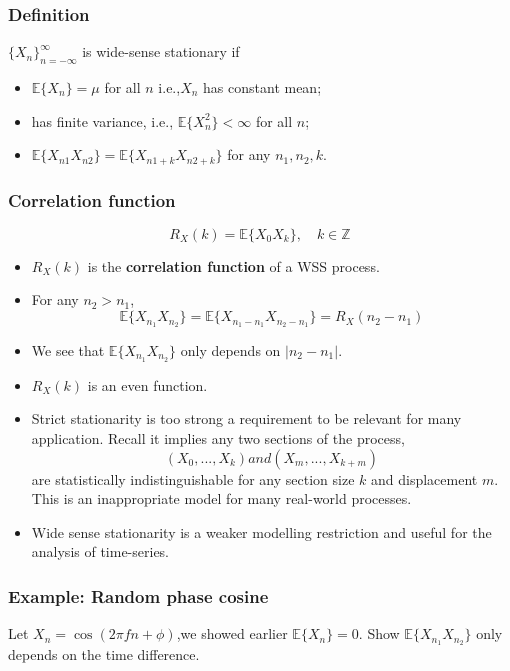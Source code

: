 \documentclass[12pt]{article}
\newcommand{\mexpproc}[1]{\mathbb{E}\{ #1\}}
\newcommand{\arproc}[1]{$\{#1_n \}_{n=-\infty}^{\infty}$}
\begin{document}
\subsubsection{Definition}
    \arproc{X} is wide-sense stationary if 
    \begin{itemize}
    \item $\mexpproc{X_n} = \mu$ for all $n$ i.e.,$X_n$ has constant mean;
    \item has finite variance, i.e., $\mexpproc{X_n^2} < \infty$ for all $n$;
    \item $\mexpproc{X_{n1}X_{n2}} = \mexpproc{X_{n1+k}X_{n2+k}}$ for any $n_1,n_2,k$.
    \end{itemize}
\subsubsection{Correlation function}
\[
R_X(k) = \mexpproc{X_0X_k}, \quad k \in \mathbb{Z}
\]
\begin{itemize}
    \item $R_X(k)$ is the \textbf{correlation function} of a WSS process.
    \item For any $n_2 > n_1$,
    \[
    \mexpproc{X_{n_1}X_{n_2}} = \mexpproc{X_{n_1 - n_1}X_{n_2-n_1}} = R_X(n_2-n_1)
    \]
    \item We see that $\mexpproc{X_{n_1}X_{n_2}}$ only depends on $|n_2 -n_1|$.
    \item $R_X(k)$ is an even function.
    \item Strict stationarity is too strong a requirement to be relevant for many application. Recall it implies any two sections of the process,
    \[
    (X_0,...,X_k) and (X_m,...,X_{k+m})
    \]
    are statistically indistinguishable for any section size $k$ and displacement $m$. This is an inappropriate model for many real-world processes.
    \item Wide sense stationarity is a weaker modelling restriction and useful for the analysis of time-series.
    
\end{itemize}
\subsubsection{Example: Random phase cosine}
Let $X_n=\cos(2\pi fn + \phi)$,we showed earlier $\mexpproc{X_n} = 0$. Show $\mexpproc{X_{n_1}X_{n_2}}$ only depends on the time difference.
\end{document}
